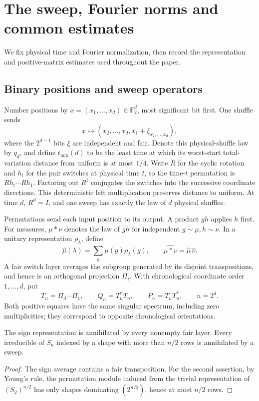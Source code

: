 \section{The sweep, Fourier norms and common estimates}\label{sec:prelim}
We fix physical time and Fourier normalization, then record the
representation and positive-matrix estimates used throughout the paper.

\subsection{Binary positions and sweep operators}
Number positions by $x=(x_1,\ldots,x_d)\in\mathbb F_2^d$, most significant bit first. One shuffle sends
\[
 x\longmapsto(x_2,\ldots,x_d,x_1+\xi_{x_2,\ldots,x_d}),
\]
where the $2^{d-1}$ bits $\xi$ are independent and fair. Denote this physical-shuffle law by $q_d$, and define $t_{\mathrm{mix}}(d)$ to be the least time at which its worst-start total-variation distance from uniform is at most $1/4$. Write $R$ for the cyclic rotation and $h_t$ for the pair switches at physical time $t$, so the time-$t$ permutation is $Rh_t\cdots Rh_1$. Factoring out $R^t$ conjugates the switches into the successive coordinate directions. This deterministic left multiplication preserves distance to uniform. At time $d$, $R^d=I$, and one sweep has exactly the law of $d$ physical shuffles.

Permutations send each input position to its output. A product $gh$ applies $h$ first. For measures, $\mu*\nu$ denotes the law of $gh$ for independent $g\sim\mu,h\sim\nu$. In a unitary representation $\rho_\lambda$, define
\[
 \widehat\mu(\lambda)=\sum_g\mu(g)\rho_\lambda(g),
 \qquad\widehat{\mu*\nu}=\widehat\mu\,\widehat\nu.
\]
A fair switch layer averages the subgroup generated by its disjoint transpositions, and hence is an orthogonal projection $\Pi_i$. With chronological coordinate order $1,\ldots,d$, put
\[
 T_n=\Pi_d\cdots\Pi_1,\qquad Q_n=T_n^*T_n,
 \qquad P_n=T_nT_n^*,\qquad n=2^d.
\]
Both positive squares have the same singular spectrum, including zero multiplicities; they correspond to opposite chronological orientations.
\begin{lemma}\label{lem:annihilation}
The sign representation is annihilated by every nonempty fair layer. Every irreducible of $S_n$ indexed by a shape with more than $n/2$ rows is annihilated by a sweep.
\end{lemma}\begin{proof}
The sign average contains a fair transposition. For the second assertion, by Young's rule, the permutation module induced from the trivial representation of $(S_2)^{n/2}$ has only shapes dominating $(2^{n/2})$, hence at most $n/2$ rows.
\end{proof}

